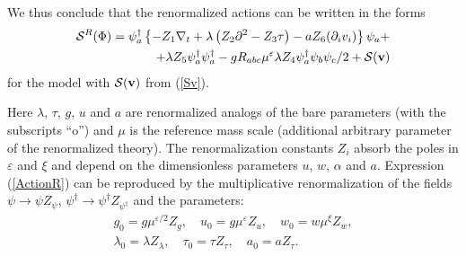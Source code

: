 \documentclass[12pt]{article}
\def\S{{\cal S}}
\def\bfv{{\bf v}}
\begin{document}
We thus conclude that the renormalized actions can be written in the forms
\begin{eqnarray}
\S^{R}(\Phi) =  \psi^{\dag}_{a} \left\{
- Z_{1} \nabla_{t} + \lambda\left( Z_{2} \partial^{2}- Z_{3}\tau\right)
- a Z_{6} (\partial_{i}v_{i}) \right\} \psi_{a}  + \\ \nonumber
+\lambda Z_{5}  \psi^{\dag}_{a}\psi^{\dag}_{a} -
gR_{abc}\mu^{\varepsilon} \lambda Z_{4}  \psi^{\dag}_{a}\psi_{b} \psi_{c} /2 +  \S(\bfv)
\label{ActionR}
\end{eqnarray}
for the model with $\S(\bfv)$ from (\ref{Sv}).

Here $\lambda$, $\tau$, $g$, $u$ and $a$ are renormalized analogs of the
bare parameters (with the subscripts ``o'') and $\mu$ is the reference mass
scale (additional arbitrary parameter of the renormalized theory). The
renormalization constants $Z_{i}$ absorb the poles in $\varepsilon$ and $\xi$ and
depend on the dimensionless parameters $u$, $w$, $\alpha$ and $a$.
Expression (\ref{ActionR}) can be reproduced by the
multiplicative renormalization of the fields $\psi \to \psi Z_{\psi}$,
$\psi^{\dag} \to \psi^{\dag} Z_{\psi^{\dag}}$
and the parameters:
\begin{eqnarray}
g_{0} = g \mu^{\varepsilon/2} Z_{g}, \quad u_{0} = g \mu^{\varepsilon} Z_{u}, \quad
w_{0} = w \mu^{\xi} Z_{w}, \nonumber \\
\lambda_{0} = \lambda Z_{\lambda}, \quad
\tau_{0} = \tau Z_{\tau},  \quad  a_{0} = a Z_{\tau}.
\label{Multy}
\end{eqnarray}
\end{document}
